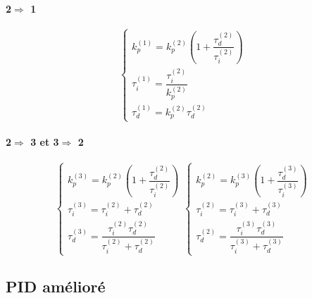 \paragraph{2$\Rightarrow$ 1}
\[
\begin{cases}
    k_p^{(1)}=k_p^{(2)}\left(
              1+\dfrac{\tau_d^{(2)}}{\tau_i^{(2)}}\right)\\[1.0em]
    \tau_i^{(1)}=\dfrac{\tau_i^{(2)}}{k_p^{(2)}}\\[1.0em]
    \tau_d^{(1)}=k_p^{(2)}\tau_d^{(2)}
\end{cases}
\]
\paragraph{2$\Rightarrow$ 3 et 3$\Rightarrow$ 2}
\[
\begin{cases}
    k_p^{(3)}=k_p^{(2)}\left(
              1+\dfrac{\tau_d^{(2)}}{\tau_i^{(2)}}\right)\\[1.0em]
    \tau_i^{(3)}=\tau_i^{(2)}+\tau_d^{(2)}\\[1.0em]
    \tau_d^{(3)}=\dfrac{\tau_i^{(2)}\tau_d^{(2)}}{\tau_i^{(2)}+\tau_d^{(2)}}
\end{cases}
\begin{cases}
    k_p^{(2)}=k_p^{(3)}\left(
              1+\dfrac{\tau_d^{(3)}}{\tau_i^{(3)}}\right)\\[1.0em]
    \tau_i^{(2)}=\tau_i^{(3)}+\tau_d^{(3)}\\[1.0em]
    \tau_d^{(2)}=\dfrac{\tau_i^{(3)}\tau_d^{(3)}}{\tau_i^{(3)}+\tau_d^{(3)}}
\end{cases}
\]
\subsection{PID amélioré}
